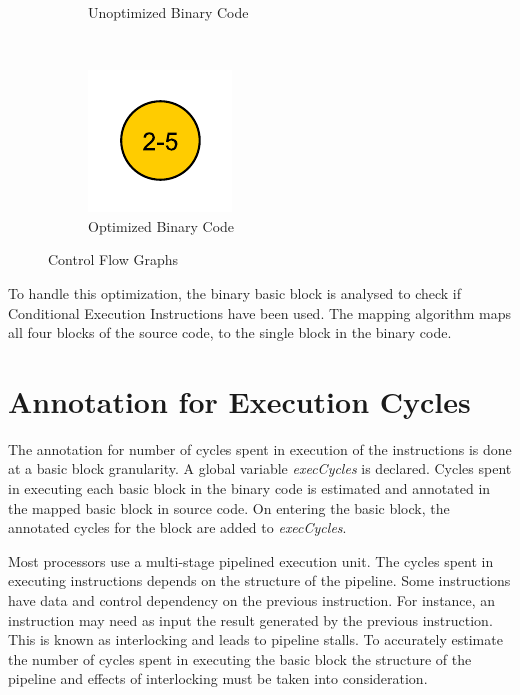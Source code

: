 \begin{figure}[h!]
\begin{subfigure}[t]{.33\textwidth}
\caption{Unoptimized Binary Code}
\label{fig:cfgUnopt}
\end{subfigure}%
~
\begin{subfigure}[t]{.33\textwidth}
\centering
\captionsetup{margin=10pt}
\includegraphics[width=.5\textwidth]{figures/CondExecObjOptFlowChart.pdf}
\caption{Optimized Binary Code}
\label{fig:cfgOpt}
\end{subfigure}
\caption{Control Flow Graphs}
\end{figure}

To handle this optimization, the binary basic block is analysed to check if Conditional Execution Instructions have been used. The mapping algorithm maps all four blocks of the source code, to the single block in the binary code. 

\section{Annotation for Execution Cycles}
The annotation for number of cycles spent in execution of the instructions is done at a basic block granularity. A global variable \emph{execCycles} is declared. Cycles spent in executing each basic block in the binary code is estimated and annotated in the mapped basic block in source code. On entering the basic block, the annotated cycles for the block are added to \emph{execCycles}.

Most processors use a multi-stage pipelined execution unit. The cycles spent in executing instructions depends on the structure of the pipeline. Some instructions have data and control dependency on the previous instruction. For instance, an instruction may need as input the result generated by the previous instruction. This is known as interlocking and leads to pipeline stalls. To accurately estimate the number of cycles spent in executing the basic block the structure of the pipeline and effects of interlocking must be taken into consideration.

